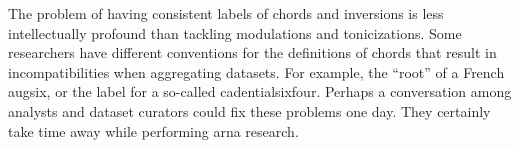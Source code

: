 
The problem of having consistent labels of chords and
inversions is less intellectually profound than tackling
modulations and tonicizations. Some researchers have
different conventions for the definitions of chords that
result in incompatibilities when aggregating datasets. For
example, the ``root'' of a French \gls{augsix}, or the label
for a so-called \gls{cadentialsixfour}. Perhaps a conversation
among analysts and dataset curators could fix these problems
one day. They certainly take time away while performing
\gls{arna} research.

